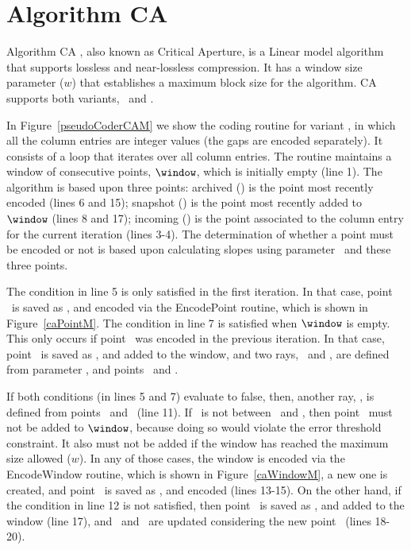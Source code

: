 
\clearpage

\section{Algorithm CA}
\label{algo:ca}


Algorithm CA \cite{coder:ca}, also known as Critical Aperture, is a Linear model algorithm that
supports lossless and near-lossless compression. It has a window size parameter ($w$) that establishes a maximum block size for the algorithm. CA supports both variants, \maskalgo\ and \NOmaskalgo.


In Figure~\ref{pseudoCoderCAM} we show the coding routine for variant \maskalgo, in which all the column entries are integer values (the gaps are encoded separately). It consists of a loop that iterates over all column entries. The routine maintains a window of consecutive points, $\window$, which is initially empty (line 1). The algorithm is based upon three points: archived (\archived) is the point most recently encoded (lines 6 and 15); snapshot (\snapshot) is the point most recently added to $\window$ (lines 8 and 17); incoming (\incoming) is the point associated to the column entry for the current iteration (lines 3-4). The determination of whether a point must be encoded or not is based upon calculating slopes using parameter \maxerror\ and these three points.





\clearpage


The condition in line 5 is only satisfied in the first iteration. In that case, point \incoming\ is saved as \archived, and encoded via the EncodePoint routine, which is shown in Figure~\ref{caPointM}. The condition in line 7 is satisfied when $\window$ is empty. This only occurs if point \archived\ was encoded in the previous iteration. In that case, point \incoming\ is saved as \snapshot, and added to the window, and two rays, \smin\ and \smax, are defined from parameter \maxerror, and points \archived\ and \snapshot.


If both conditions (in lines 5 and 7) evaluate to false, then, another ray, \EseE, is defined from points \archived\ and \incoming\ (line 11). If \EseE\ is not between \smin\ and \smax, then point \incoming\ must not be added to $\window$, because doing so would violate the error threshold constraint. It also must not be added if the window has reached the maximum size allowed ($w$). In any of those cases, the window is encoded via the EncodeWindow routine, which is shown in Figure~\ref{caWindowM}, a new one is created, and point \incoming\ is saved as \archived, and encoded (lines 13-15). On the other hand, if the condition in line 12 is not satisfied, then point \incoming\ is saved as \snapshot, and added to the window (line 17), and \smin\ and \smax\ are updated considering the new point \snapshot\ (lines 18-20).


